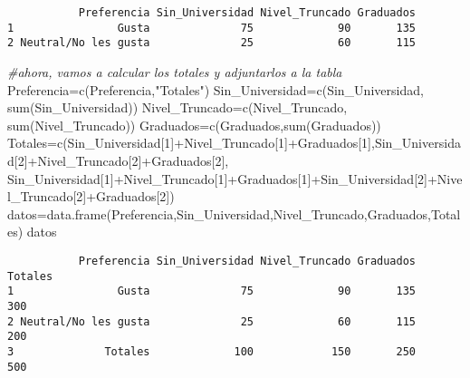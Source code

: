 \documentclass[
  a4paper,
  oneside,
  openany]{book}
\newenvironment{Shaded}{\begin{snugshade}}{\end{snugshade}}
\newcommand{\CommentTok}[1]{\textcolor[rgb]{0.56,0.35,0.01}{\textit{#1}}}
\newcommand{\DecValTok}[1]{\textcolor[rgb]{0.00,0.00,0.81}{#1}}
\newcommand{\FunctionTok}[1]{\textcolor[rgb]{0.00,0.00,0.00}{#1}}
\newcommand{\NormalTok}[1]{#1}
\newcommand{\OtherTok}[1]{\textcolor[rgb]{0.56,0.35,0.01}{#1}}
\newcommand{\SpecialCharTok}[1]{\textcolor[rgb]{0.00,0.00,0.00}{#1}}
\newcommand{\StringTok}[1]{\textcolor[rgb]{0.31,0.60,0.02}{#1}}
\begin{document}
\begin{verbatim}
           Preferencia Sin_Universidad Nivel_Truncado Graduados
1                Gusta              75             90       135
2 Neutral/No les gusta              25             60       115
\end{verbatim}

\begin{Shaded}
\begin{Highlighting}[]
\CommentTok{\#ahora, vamos a calcular los totales y adjuntarlos a la tabla}
\NormalTok{Preferencia}\OtherTok{=}\FunctionTok{c}\NormalTok{(Preferencia,}\StringTok{"Totales"}\NormalTok{)}
\NormalTok{Sin\_Universidad}\OtherTok{=}\FunctionTok{c}\NormalTok{(Sin\_Universidad, }\FunctionTok{sum}\NormalTok{(Sin\_Universidad))}
\NormalTok{Nivel\_Truncado}\OtherTok{=}\FunctionTok{c}\NormalTok{(Nivel\_Truncado, }\FunctionTok{sum}\NormalTok{(Nivel\_Truncado))}
\NormalTok{Graduados}\OtherTok{=}\FunctionTok{c}\NormalTok{(Graduados,}\FunctionTok{sum}\NormalTok{(Graduados))}
\NormalTok{Totales}\OtherTok{=}\FunctionTok{c}\NormalTok{(Sin\_Universidad[}\DecValTok{1}\NormalTok{]}\SpecialCharTok{+}\NormalTok{Nivel\_Truncado[}\DecValTok{1}\NormalTok{]}\SpecialCharTok{+}\NormalTok{Graduados[}\DecValTok{1}\NormalTok{],Sin\_Universidad[}\DecValTok{2}\NormalTok{]}\SpecialCharTok{+}\NormalTok{Nivel\_Truncado[}\DecValTok{2}\NormalTok{]}\SpecialCharTok{+}\NormalTok{Graduados[}\DecValTok{2}\NormalTok{],}
\NormalTok{           Sin\_Universidad[}\DecValTok{1}\NormalTok{]}\SpecialCharTok{+}\NormalTok{Nivel\_Truncado[}\DecValTok{1}\NormalTok{]}\SpecialCharTok{+}\NormalTok{Graduados[}\DecValTok{1}\NormalTok{]}\SpecialCharTok{+}\NormalTok{Sin\_Universidad[}\DecValTok{2}\NormalTok{]}\SpecialCharTok{+}\NormalTok{Nivel\_Truncado[}\DecValTok{2}\NormalTok{]}\SpecialCharTok{+}\NormalTok{Graduados[}\DecValTok{2}\NormalTok{])}
\NormalTok{datos}\OtherTok{=}\FunctionTok{data.frame}\NormalTok{(Preferencia,Sin\_Universidad,Nivel\_Truncado,Graduados,Totales)}
\NormalTok{datos}
\end{Highlighting}
\end{Shaded}

\begin{verbatim}
           Preferencia Sin_Universidad Nivel_Truncado Graduados Totales
1                Gusta              75             90       135     300
2 Neutral/No les gusta              25             60       115     200
3              Totales             100            150       250     500
\end{verbatim}
\end{document}
